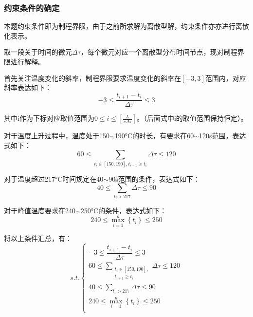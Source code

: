 \documentclass[a4paper,12pt]{ctexart} %
\begin{document}
	\subsubsection{约束条件的确定}
	本题约束条件即为制程界限，由于之前所求解为离散型解，约束条件亦亦进行离散化表示。\par
	取一段关于时间的微元$\varDelta\tau$，每个微元对应一个离散型分布时间节点，现对制程界限进行解释。\par
	首先关注温度变化的斜率，制程界限要求温度变化的斜率在$[-3,3]$范围内，对应斜率表达如下：
	\begin{equation}
	-3\leqslant\frac{t_{i+1}-t_i}{\varDelta\tau}\leqslant 3
	\end{equation}\par
	其中i作为下标对应取值范围为$0\leqslant i\leqslant [\frac{L}{v\varDelta\tau}]$。（后面式中i的取值范围保持恒定）。\par
	对于温度上升过程中，温度处于150$\sim$190°C的时长，有要求在60$\sim$120s范围，表达式如下：
	\begin{equation}
	60\leqslant\sum_{t_i\in[150,190],t_{i+1}\geqslant t_i} \varDelta\tau\leqslant 120
	\end{equation}\par
	对于温度超过217°C时间规定在40$\sim$90s范围的条件，表达式如下：
	\begin{equation}
	40\leqslant\sum_{t_i>217}\varDelta\tau\leqslant 90
	\end{equation}\par
	对于峰值温度要求在240$\sim$250°C的条件，表达式如下：
	\begin{equation}
	240\leqslant\max_{i=1}^{n}\left\{t_i\right\}\leqslant 250
	\end{equation}\par
	将以上条件汇总，有：
	\begin{equation}
	s.t.\begin{cases}
	-3\leqslant\dfrac{t_{i+1}-t_i}{\varDelta\tau}\leqslant 3\\[1em]
	60\leqslant\sum\limits_{\begin{smallmatrix}
		t_i\in[150,190],\\
		t_{i+1}\geqslant t_i
		\end{smallmatrix}} \varDelta\tau\leqslant 120\\[1em]
	40\leqslant\sum\limits_{t_i>217}\varDelta\tau\leqslant 90\\[1em]
	240\leqslant\max\limits_{i=1}^{n}\left\{t_i\right\}\leqslant 250\\[1em]
	\end{cases}
	\end{equation}\par
\end{document}
